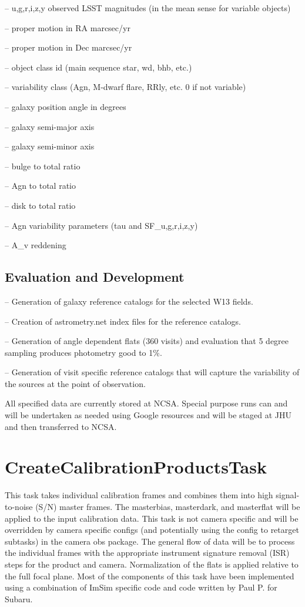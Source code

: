 \documentclass[prd, nofootinbib, floatfix, 11pt,tightenlines,times]{article}
\begin{document}
-- {u,g,r,i,z,y} observed LSST magnitudes (in the mean sense for variable objects)

-- proper motion in RA marcsec/yr

-- proper motion in Dec marcsec/yr

-- object class id (main sequence star, wd, bhb, etc.)

-- variability class (Agn, M-dwarf flare, RRly, etc.  0 if not variable)

-- galaxy position angle in degrees 

-- galaxy semi-major axis 

-- galaxy semi-minor axis

-- bulge to total ratio

-- Agn to total ratio

-- disk to total ratio

-- Agn variability parameters (tau and SF\_{u,g,r,i,z,y})

-- A\_v reddening 

\subsection{Evaluation and Development}

-- Generation of galaxy reference catalogs for the selected W13 fields.

-- Creation of astrometry.net index files for the reference catalogs.

-- Generation of angle dependent flats (360 visits) and evaluation
that 5 degree sampling produces photometry good to 1\%.

-- Generation of visit specific reference catalogs that will capture
the  variability of the sources at the point of observation.

All specified data are currently stored at NCSA.  Special purpose runs
can and will be undertaken as needed using Google resources and
will be staged at JHU and then transferred to NCSA.  


\section{CreateCalibrationProductsTask} 
This task takes individual calibration frames and combines them into
high signal-to-noise (S/N) master frames.  The masterbias, masterdark,
and masterflat will be applied to the input calibration data. This task is not 
camera specific and will be overridden by camera specific
configs (and potentially using the config to retarget subtasks) in the
camera obs package.  The general flow of data will be to process the
individual frames with the appropriate instrument signature removal
(ISR) steps for the product and camera.  Normalization of the flats is
applied relative to the full focal plane. Most of the components of
this task have been implemented using a combination of ImSim specific
code and code written by Paul P. for Subaru.
\end{document}
